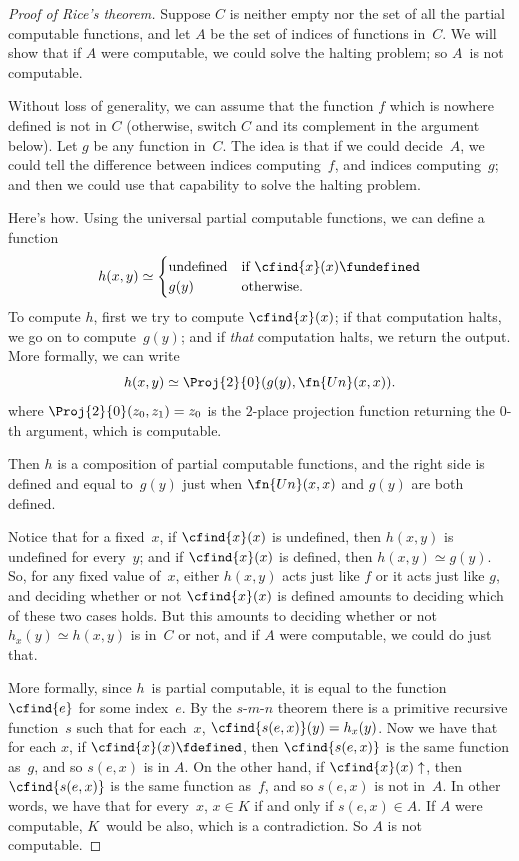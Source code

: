 \documentclass[../../../include/open-logic-section]{subfiles}
\begin{document}
\begin{proof}[Proof of Rice's theorem]
Suppose $C$ is neither empty nor the set of all the partial
computable functions, and let $A$ be the set of indices of functions
in~$C$. We will show that if $A$ were computable, we could solve the
halting problem; so $A$~is not computable.

Without loss of generality, we can assume that the function $f$ which
is nowhere defined is not in $C$ (otherwise, switch $C$ and its
complement in the argument below). Let $g$ be any function in~$C$. The
idea is that if we could decide~$A$, we could tell the difference
between indices computing~$f$, and indices computing~$g$; and then we
could use that capability to solve the halting problem.

Here's how. Using the universal partial computable functions, we can
define a function
\[
h(x,y) \simeq
\begin{cases}
\text{undefined} & \text{if $\cfind{x}(x) \fundefined$} \\
g(y) & \text{otherwise.}
\end{cases}
\]
To compute $h$, first we try to compute $\cfind{x}(x)$; if that
computation halts, we go on to compute~$g(y)$; and if {\em that}
computation halts, we return the output. More formally, we can write
\[
h(x,y) \simeq \Proj{2}{0}(g(y),\fn{Un}(x,x)).
\]
where $\Proj{2}{0}(z_0, z_1) = z_0$ is the $2$-place projection
function returning the $0$-th argument, which is computable.

Then $h$ is a composition of partial computable functions, and the right
side is defined and equal to~$g(y)$ just when $\fn{Un}(x,x)$ and
$g(y)$ are both defined.

Notice that for a fixed~$x$, if $\cfind{x}(x)$ is undefined, then
$h(x,y)$ is undefined for every~$y$; and if $\cfind{x}(x)$ is defined,
then $h(x,y) \simeq g(y)$. So, for any fixed value of~$x$, either
$h(x,y)$ acts just like $f$ or it acts just like $g$, and deciding
whether or not $\cfind{x}(x)$ is defined amounts to deciding which of
these two cases holds. But this amounts to deciding whether or not
$h_x(y) \simeq h(x,y)$ is in~$C$ or not, and if $A$ were computable,
we could do just that.

More formally, since $h$~is partial computable, it is equal to the
function $\cfind{e}$ for some index~$e$. By the $s$-$m$-$n$ theorem
there is a primitive recursive function~$s$ such that for each~$x$,
$\cfind{s(e,x)}(y) = h_x(y)$. Now we have that for each $x$, if
$\cfind{x}(x) \fdefined$, then $\cfind{s(e,x)}$ is the same function
as~$g$, and so $s(e,x)$ is in $A$. On the other hand, if $\cfind{x}(x)
\uparrow$, then $\cfind{s(e,x)}$ is the same function as~$f$, and so
$s(e,x)$ is not in~$A$. In other words, we have that for every~$x$, $x
\in K$ if and only if $s(e,x) \in A$. If $A$ were computable,
$K$~would be also, which is a contradiction. So $A$ is not computable.
\end{proof}
\end{document}
